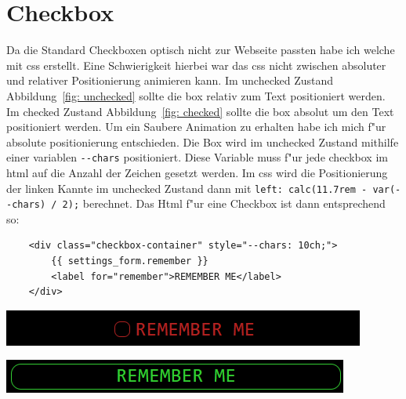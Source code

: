 \section{Checkbox}\label{sec:checkbox}
\lstset{basicstyle=\selectfont\ttfamily, language=CSS}

Da die Standard Checkboxen optisch nicht zur Webseite passten habe ich welche mit css erstellt.
Eine Schwierigkeit hierbei war das css nicht zwischen absoluter und relativer Positionierung animieren kann.
Im unchecked Zustand Abbildung~\ref{fig: unchecked} sollte die box relativ zum Text positioniert werden.
Im checked Zustand Abbildung~\ref{fig: checked} sollte die box absolut um den Text positioniert werden.
Um ein Saubere Animation zu erhalten habe ich mich f{"u}r absolute positionierung entschieden.
Die Box wird im unchecked Zustand mithilfe einer variablen \lstinline$--chars$ positioniert.
Diese Variable muss f{"u}r jede checkbox im html auf die Anzahl der Zeichen gesetzt werden.
Im css wird die Positionierung der linken Kannte im unchecked Zustand dann mit \lstinline$left: calc(11.7rem - var(--chars) / 2);$ berechnet.
Das Html f{"u}r eine Checkbox ist dann entsprechend so:

\vspace{3mm}
\begin{lstlisting}
    <div class="checkbox-container" style="--chars: 10ch;">
        {{ settings_form.remember }}
        <label for="remember">REMEMBER ME</label>
    </div>
\end{lstlisting}
\vspace{3mm}

\begin{minipage}[h]{0.425\textwidth}
    \includegraphics[width=\textwidth]{unchecked}
    \label{fig: unchecked}
\end{minipage}
\hspace{0.05\textwidth}
\begin{minipage}[h]{0.425\textwidth}
    \includegraphics[width=\textwidth]{checked}
    \label{fig: checked}
\end{minipage}


